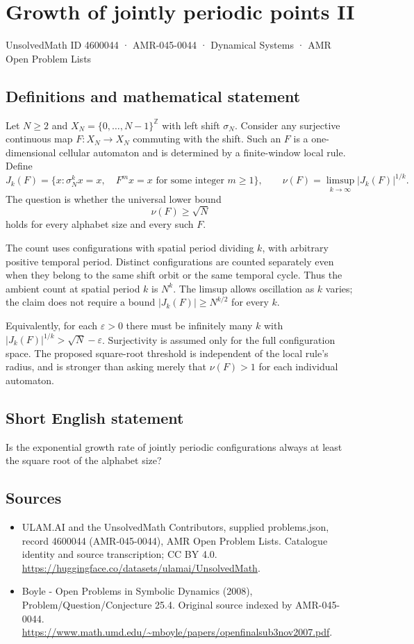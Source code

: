 \documentclass[11pt,a4paper]{article}
\begin{document}
\section*{Growth of jointly periodic points II}\label{4600044}
{\small UnsolvedMath ID 4600044 · AMR-045-0044 · Dynamical Systems · AMR Open Problem Lists}
\subsection{Definitions and mathematical statement}
Let $N\ge2$ and $X_N=\{0,\ldots,N-1\}^{\mathbb Z}$ with
left shift $\sigma_N$. Consider any surjective continuous map
$F:X_N\to X_N$ commuting with the shift. Such an $F$ is a
one-dimensional cellular automaton and is determined by a
finite-window local rule. Define
\[
 J_k(F)=\{x:\sigma_N^k x=x,\quad
                   F^m x=x\text{ for some integer }m\ge1\},
 \qquad \nu(F)=\limsup_{k\to\infty}|J_k(F)|^{1/k}.
\]
The question is whether the universal lower bound
\[
                           \nu(F)\ge\sqrt N
\]
holds for every alphabet size and every such $F$.

The count uses configurations with spatial period dividing $k$,
with arbitrary positive temporal period. Distinct configurations
are counted separately even when they belong to the same shift
orbit or the same temporal cycle. Thus the ambient count at
spatial period $k$ is $N^k$. The limsup allows oscillation as
$k$ varies; the claim does not require a bound
$|J_k(F)|\ge N^{k/2}$ for every $k$.

Equivalently, for each $\varepsilon>0$ there must be infinitely
many $k$ with $|J_k(F)|^{1/k}>\sqrt N-\varepsilon$.
Surjectivity is assumed only for the full configuration space.
The proposed square-root threshold is independent of the local
rule's radius, and is stronger than asking merely that
$\nu(F)>1$ for each individual automaton.
\subsection{Short English statement}
Is the exponential growth rate of jointly periodic configurations always at least the square root of the alphabet size?
\subsection{Sources}
\begin{itemize}
\item[S1] ULAM.AI and the UnsolvedMath Contributors, supplied problems.json, record 4600044 (AMR-045-0044), AMR Open Problem Lists. Catalogue identity and source transcription; CC BY 4.0.
\url{https://huggingface.co/datasets/ulamai/UnsolvedMath}.
\item[S2] Boyle - Open Problems in Symbolic Dynamics (2008), Problem/Question/Conjecture 25.4. Original source indexed by AMR-045-0044.
\url{https://www.math.umd.edu/~mboyle/papers/openfinalsub3nov2007.pdf}.
\end{itemize}
\end{document}
